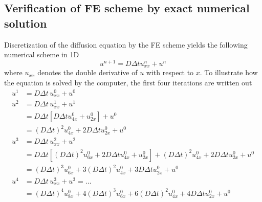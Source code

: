 \subsection{Verification of FE scheme by exact numerical solution}\label{exact_numerical_solution}

Discretization of the diffusion equation by the FE scheme yields the following numerical scheme in 1D
\begin{equation}
 u^{n+1} = D\Delta t u^n_{xx} + u^n
\end{equation}
where $u_{xx}$ denotes the double derivative of $u$ with respect to $x$. 
To illustrate how the equation is solved by the computer, the first four iterations are written out
\begin{align*}
 u^1 &= D\Delta t\, u_{xx}^0 + u^0 \\
 u^2 &= D\Delta t\, u_{xx}^1 + u^1 \\
 &= D\Delta t\left[D\Delta t u_{4x}^0 + u_{2x}^0\right] + u^0\\
 &= \left(D\Delta t\right)^2 u_{4x}^0 + 2D\Delta t u_{2x}^0+ u^0 \\
 u^3 &= D\Delta t\, u_{xx}^2 + u^2 \\
 &= D\Delta t\left[\left(D\Delta t\right)^2 u_{6x}^0 + 2D\Delta t u_{4x}^0+ u_{2x}^0\right] + \left(D\Delta t\right)^2 u_{4x}^0 + 2D\Delta t u_{2x}^0+ u^0\\
 &= \left(D\Delta t\right)^3 u_{6x}^0 + 3\left(D\Delta t\right)^2 u_{4x}^0+ 3D\Delta tu_{2x}^0 + u^0 \\
 u^4 &= D\Delta t \,u_{xx}^3 + u^3 = \dots \\
 &= \left(D\Delta t\right)^4 u_{8x}^0 + 4\left(D\Delta t\right)^3 u_{6x}^0+ 6\left(D\Delta t\right)^2 u_{4x}^0 + 4D\Delta t u_{2x}^0 + u^0 
\end{align*}

